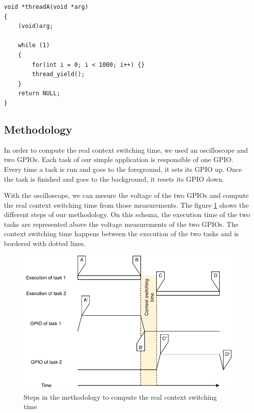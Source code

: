 \begin{lstlisting}[style=CStyle, float, label={lst:simple-task-code-riot}, caption={Source code of a task implemented in RIOT OS for the simple application}]
void *threadA(void *arg)
{
    (void)arg;

    while (1)
    {
        for(int i = 0; i < 1000; i++) {}
        thread_yield();
    }
    return NULL;
}
\end{lstlisting}


\subsection{Methodology}

In order to compute the real context switching time, we used an oscilloscope and two GPIOs.
Each task of our simple application is responsible of one GPIO.
Every time a task is run and goes to the foreground, it sets its GPIO up.
Once the task is finished and goes to the background, it resets its GPIO down.

With the oscilloscope, we can mesure the voltage of the two GPIOs and compute the real context switching time from those measurements.
The figure \ref{fig:real-context-switching-time-measurement} shows the different steps of our methodology.
On this schema, the execution time of the two tasks are represented above the voltage measurements of the two GPIOs.
The context switching time happens between the execution of the two tasks and is bordered with dotted lines.

\begin{figure}[!ht]
  \centering
  \includegraphics[scale=1]{assets/real-context-switching-time-measurement.pdf}
  \caption{\label{fig:real-context-switching-time-measurement}Steps in the methodology to compute the real context switching time}
\end{figure}

